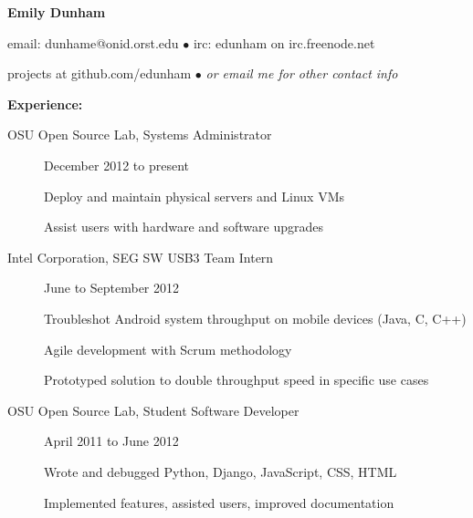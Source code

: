 \documentclass[11pt]{article}
\begin{document}
\centerline{{\LARGE \bf Emily Dunham}}

\bigskip

\centerline{email: dunhame@onid.orst.edu
        $\bullet$
        irc: edunham on irc.freenode.net}
\centerline{projects at github.com/edunham
        $\bullet$
        \emph{or email me for other contact info}}

\bigskip
\hrulefill
\bigskip

{\Large \bf Experience:}
\begin{description}
\item[OSU Open Source Lab, Systems Administrator]
    \hfill December 2012 to present

    Deploy and maintain physical servers and Linux VMs

    Assist users with hardware and software upgrades

\item[Intel Corporation, SEG SW USB3 Team Intern]
    \hfill June to September 2012

    Troubleshot Android system throughput on mobile devices (Java, C, C++)

    Agile development with Scrum methodology

    Prototyped solution to double throughput speed in specific use cases

\item[OSU Open Source Lab, Student Software Developer]
    \hfill April 2011 to June 2012

    Wrote and debugged Python, Django, JavaScript, CSS, HTML

    Implemented features, assisted users, improved documentation
\end{description}

\smallskip
\hrulefill
\bigskip
\end{document}
